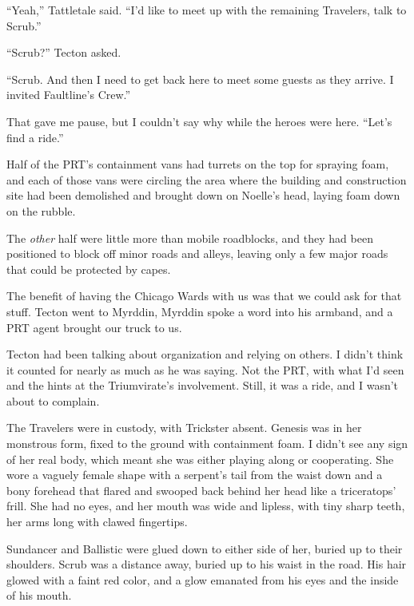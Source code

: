 ``Yeah,'' Tattletale said.  ``I'd like to meet up with the remaining Travelers, talk to Scrub.''



``Scrub?'' Tecton asked.



``Scrub.  And then I need to get back here to meet some guests as they arrive.  I invited Faultline's Crew.''



That gave me pause, but I couldn't say why while the heroes were here.  ``Let's find a ride.''



Half of the PRT's containment vans had turrets on the top for spraying foam, and each of those vans were circling the area where the building and construction site had been demolished and brought down on Noelle's head, laying foam down on the rubble.



The \emph{other} half were little more than mobile roadblocks, and they had been positioned to block off minor roads and alleys, leaving only a few major roads that could be protected by capes.



The benefit of having the Chicago Wards with us was that we could ask for that stuff.  Tecton went to Myrddin, Myrddin spoke a word into his armband, and a PRT agent brought our truck to us.



Tecton had been talking about organization and relying on others.  I didn't think it counted for nearly as much as he was saying.  Not the PRT, with what I'd seen and the hints at the Triumvirate's involvement.  Still, it was a ride, and I wasn't about to complain.



\sectionbreak



The Travelers were in custody, with Trickster absent.  Genesis was in her monstrous form, fixed to the ground with containment foam.  I didn't see any sign of her real body, which meant she was either playing along or cooperating.  She wore a vaguely female shape with a serpent's tail from the waist down and a bony forehead that flared and swooped back behind her head like a triceratops' frill.  She had no eyes, and her mouth was wide and lipless, with tiny sharp teeth, her arms long with clawed fingertips.



Sundancer and Ballistic were glued down to either side of her, buried up to their shoulders.  Scrub was a distance away, buried up to his waist in the road.  His hair glowed with a faint red color, and a glow emanated from his eyes and the inside of his mouth.



